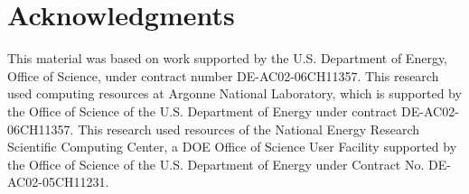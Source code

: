 
\section*{Acknowledgments}

This material was based on work supported by the U.S. Department of Energy, Office of Science, under contract number DE-AC02-06CH11357.
This research used computing resources 
at Argonne National Laboratory, which is supported by the Office of Science 
of the U.S. Department of Energy under contract DE-AC02-06CH11357.
This research used resources of the National Energy Research Scientific Computing Center, a DOE Office of Science User Facility supported by the Office of Science of the U.S. Department of Energy under Contract No. DE-AC02-05CH11231.

